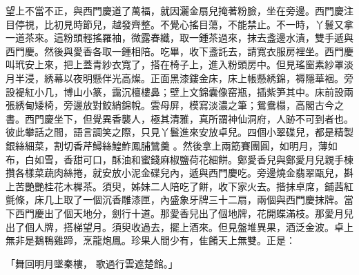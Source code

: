 \begin{showcontents}{}
望上不當不正，與西門慶道了萬福，就因灑金扇兒掩著粉臉，坐在旁邊。西門慶注目停視，比初見時節兒，越發齊整。不覺心搖目蕩，不能禁止。不一時，丫鬟又拿一道茶來。這粉頭輕搖羅袖，微露春纖，取一鍾茶過來，抹去盞邊水漬，雙手遞與西門慶。然後與愛香各取一鍾相陪。吃畢，收下盞託去，請寬衣服房裡坐。西門慶叫玳安上來，把上蓋青紗衣寬了，搭在椅子上，進入粉頭房中。但見瑤窗素紗罩淡月半浸，綉幕以夜明懸伴光高燦。正面黑漆鏤金床，床上帳懸綉錦，褥隱華裀。旁設褆紅小几，博山小篆，靄沉檀樓鼻；壁上文錦囊像窑瓶，插紫笋其中。床前設兩張綉甸矮椅，旁邊放對鮫綃錦帨。雲母屏，模寫淡濃之筆；鴛鴦榻，高閣古今之書。西門慶坐下，但覺異香襲人，極其清雅，真所謂神仙洞府，人跡不可到者也。彼此攀話之間，語言調笑之際，只見丫鬟進來安放卓兒。四個小翠碟兒，都是精製銀絲細菜，割切香芹鱘絲鰉鮓鳳脯鷥羹 。然後拿上兩筯賽團圓，如明月，薄如布，白如雪，香甜可口，酥油和蜜錢麻椒鹽荷花細餅。鄭愛香兒與鄭愛月兒親手楝攢各樣菜蔬肉絲捲，就安放小泥金碟兒內，遞與西門慶吃。旁邊燒金翡翠甌兒，斟上苦艷艷桂花木樨茶。須臾，姊妹二人陪吃了餅，收下家火去。揩抹卓席，鋪茜紅氈條，床几上取了一個沉香雕漆匣，內盛象牙牌三十二扇，兩個與西門慶抹牌。當下西門慶出了個天地分，劍行十道。那愛香兒出了個地牌，花開蝶滿枝。那愛月兒出了個人牌，搭梯望月。須臾收過去，擺上酒來。但見盤堆異果，酒泛金波。卓上無非是鵝鴨雞蹄，烹龍炮鳳。珍果人間少有，隹餚天上無雙。正是：

「舞回明月墜秦樓，  歌過行雲遮楚館。」


\end{showcontents}
